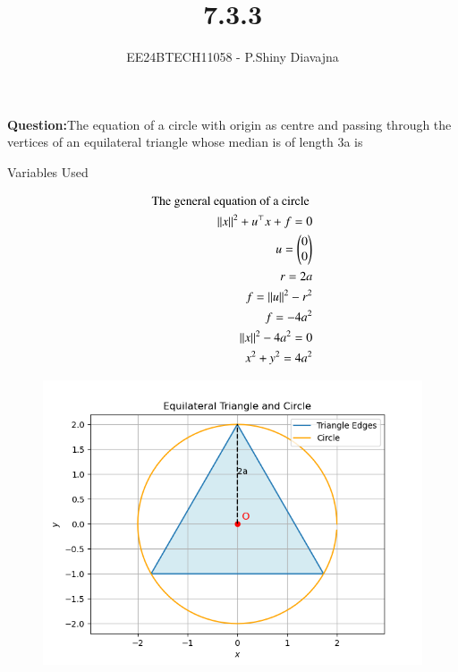 \documentclass[journal]{IEEEtran}
\begin{document}

\vspace{3cm}

\title{7.3.3}
\author{EE24BTECH11058 - P.Shiny Diavajna}
{\let\newpage\relax\maketitle}

\renewcommand{\thefigure}{\theenumi}
\renewcommand{\thetable}{\theenumi}
\setlength{\intextsep}{10pt} %


\renewcommand{\thetable}{\theenumi}

\textbf{Question:}The equation of a circle with origin as centre and passing through the vertices of an equilateral triangle whose median is of length 3a is \\


   \solution
   \begin{table}[h!]    
     \centering
     
     \caption{Variables Used}
     \label{}
   \end{table}

    \begin{align}
	    \text{The general equation of a circle }\\
{\left\lVert x\right\rVert} ^ 2 + {u}^\top x + f =0\\
u = \begin{pmatrix}0\\ 0\end{pmatrix}\\
r = 2a\\
f = {\left\lVert u\right\rVert}^2 - {r}^2 \\
f = -4 {a} ^2\\
{\left\lVert x\right\rVert} ^ 2 - 4a ^2 =0\\
x^2 + y^2 = 4a^2\\
\end{align}

    \begin{figure}[h]
    \centering
    \includegraphics[width=\columnwidth]{figs/Figure_1.png}
 \end{figure}
\end{document}
